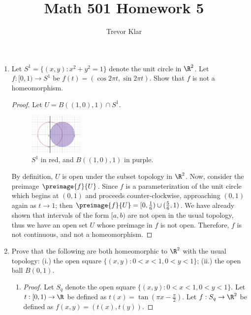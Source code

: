 \documentclass[letterpaper]{article}
\title{Math 501 \linebreak
Homework 5}
\author{Trevor Klar}
\begin{document}
\maketitle


\begin{enumerate}
\item Let $S^1=\{(x,y):x^2+y^2=1\}$ denote the unit circle in $\R^2$. Let $f:[0,1)\to S^1$ be $f(t) = (\cos{2\pi t}, \sin{2\pi t})$. Show that $f$ is not a homeomorphism. 
\begin{proof}
Let $U=B((1,0),1)\cap S^1$. 

\begin{figure}[h]
  \begin{center}
    \includegraphics[width=0.25\textwidth]{../images/501_hw5_prob1_fig1}
  \end{center}
  \caption{$S^1$ in red, and $B((1,0),1)$ in purple.}
\end{figure}

By definition, $U$ is open under the subset topology in $\R^2$. Now, consider the preimage $\preimage{f}{U}$. %
Since $f$ is a parameterization of the unit circle which begins at $(0,1)$ and proceeds counter-clockwise, approaching $(0,1)$ again as $t\to 1$; then $\preimage{f}{U}=[0,\frac{1}{6})\cup(\frac{5}{6},1)$. We have already shown that intervals of the form $[a,b)$ are not open in the usual topology, thus we have an open set $U$ whose preimage in $f$ is not open. Therefore, $f$ is not continuous, and not a homeomorphism. 
\end{proof}

\pagebreak
\item Prove that the following are both homeomorphic to $\R^2$ with the usual topology: (i.) the open square $\{(x,y) : 0 < x < 1, 0 < y < 1\}$; (ii.) the open ball $B(0,1)$.
\begin{enumerate}[label=(\roman*.)]
\item \begin{proof} Let $S_q$ denote the open square $\{(x,y) : 0 < x < 1, 0 < y < 1\}$. Let $t:[0,1)\to\R$ be defined as $t(x)=\tan(\pi x - \frac{\pi}{2})$. Let $f:S_q\to\R^2$ be defined as $f(x,y)=\left(t(x), t(y)\right)$. 


\end{proof}
\end{enumerate}
\end{enumerate}
\end{document}
